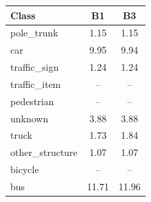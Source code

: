 \begin{tabular}{lcc}
\toprule
Class & B1 & B3 \\
\midrule
pole\_trunk & 1.15 & 1.15 \\
car & 9.95 & 9.94 \\
traffic\_sign & 1.24 & 1.24 \\
traffic\_item & -- & -- \\
pedestrian & -- & -- \\
unknown & 3.88 & 3.88 \\
truck & 1.73 & 1.84 \\
other\_structure & 1.07 & 1.07 \\
bicycle & -- & -- \\
bus & 11.71 & 11.96 \\
\bottomrule
\end{tabular}
